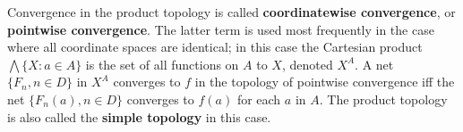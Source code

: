 Convergence in the product topology is called \textbf{coordinatewise convergence}, or \textbf{pointwise convergence}. The latter term is used most frequently in the case where all coordinate spaces are identical; in this case the Cartesian product $\bigwedge \{X : a \in A\}$ is the set of all functions on $A$ to $X$, denoted $X^A$. A net $\{F_n, n \in D\}$ in $X^A$ converges to $f$ in the topology of pointwise convergence iff the net $\{F_n(a), n \in D\}$ converges to $f(a)$ for each $a$ in $A$. The product topology is also called the \textbf{simple topology} in this case.
